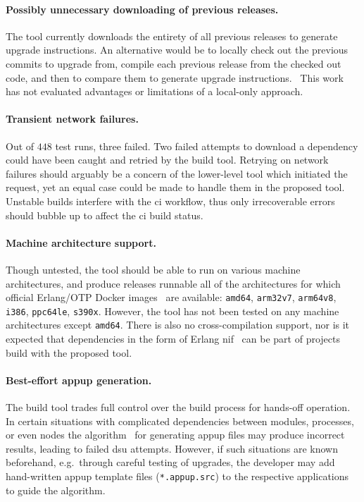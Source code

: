 \paragraph{Possibly unnecessary downloading of previous releases.} The tool currently downloads the entirety of all previous releases to generate upgrade instructions. An alternative would be to locally check out the previous commits to upgrade from, compile each previous release from the checked out code, and then to compare them to generate upgrade instructions.~\cite{rebar3appup} This work has not evaluated advantages or limitations of a local-only approach.

\paragraph{Transient network failures.} Out of $448$ test runs, three failed. Two failed attempts to download a dependency could have been caught and retried by the build tool. Retrying on network failures should arguably be a concern of the lower-level tool which initiated the request, yet an equal case could be made to handle them in the proposed tool. Unstable builds interfere with the \acrshort{ci} workflow, thus only irrecoverable errors should bubble up to affect the \acrshort{ci} build status.

\paragraph{Machine architecture support.} Though untested, the tool should be able to run on various machine architectures, and produce releases runnable all of the architectures for which official Erlang/OTP Docker images~\cite{docker:erlang} are available: \lstinline|amd64|, \lstinline|arm32v7|, \lstinline|arm64v8|, \lstinline|i386|, \lstinline|ppc64le|, \lstinline|s390x|. However, the tool has not been tested on any machine architectures except \lstinline|amd64|. There is also no cross-compilation support, nor is it expected that dependencies in the form of Erlang \acrfull{nif}~\cite{doc:otp} can be part of projects build with the proposed tool.

\paragraph{Best-effort \acrshort{appup} generation.} The build tool trades full control over the build process for hands-off operation. In certain situations with complicated dependencies between modules, processes, or even nodes the algorithm~\cite{rebar3appup}
for generating \acrfull{appup} files may produce incorrect results, leading to failed \acrshort{dsu} attempts. However, if such situations are known beforehand, e.g.~through careful testing of upgrades, the developer may add hand-written \acrshort{appup} template files (\lstinline|*.appup.src|) to the respective applications to guide the algorithm.

